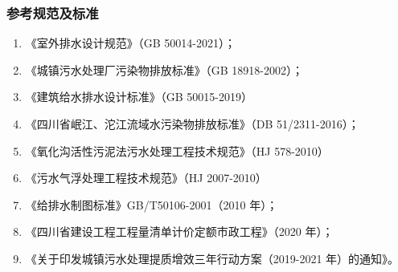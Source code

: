 \subsubsection{参考规范及标准}
\begin{enumerate}
	\item 《室外排水设计规范》（GB 50014-2021）；
	\item 《城镇污水处理厂污染物排放标准》（GB 18918-2002）；
	\item 《建筑给水排水设计标准》（GB 50015-2019）
	\item 《四川省岷江、沱江流域水污染物排放标准》（DB 51/2311-2016）；
	\item 《氧化沟活性污泥法污水处理工程技术规范》（HJ 578-2010）
	\item 《污水气浮处理工程技术规范》（HJ 2007-2010）
	\item 《给排水制图标准》GB/T50106-2001（2010 年）；
	\item 《四川省建设工程工程量清单计价定额市政工程》（2020 年）；
	\item 《关于印发城镇污水处理提质增效三年行动方案（2019-2021 年）的通知》。
\end{enumerate}



\newpage %